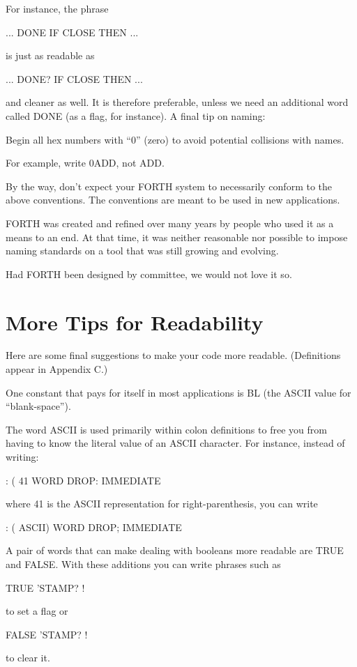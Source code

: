 For instance, the phrase
\begin{Code}
... DONE IF CLOSE THEN ...
\end{Code}
is just as readable as
\begin{Code}
... DONE? IF CLOSE THEN ...
\end{Code}
and cleaner as well.  It is therefore preferable, unless we need an additional
word called DONE (as a flag, for instance).
A final tip on naming:

\begin{tip}
Begin all hex numbers with ``0'' (zero) to avoid potential collisions with
names.
\end{tip}
For example, write 0ADD, not ADD.

By the way, don't expect your FORTH system to necessarily conform
to the above conventions.  The conventions are meant to be used in
new applications.

FORTH was created and refined over many years by people who
used it as a means to an end.  At that time, it was neither reasonable nor
possible to impose naming standards on a tool that was still growing and
evolving.

Had FORTH been designed by committee, we would not love it so.

\section{More Tips for Readability}

Here are some final suggestions to make your code more readable.
(Definitions appear in Appendix C.)

One constant that pays for itself in most applications is BL (the
ASCII value for ``blank-space'').

The word ASCII is used primarily within colon definitions to free
you from having to know the literal value of an ASCII character.  For instance,
instead of writing:
\begin{Code}
: ( 41 WORD DROP: IMMEDIATE
\end{Code}
where 41 is the ASCII representation for right-parenthesis, you can write
\begin{Code}
: ( ASCII) WORD DROP; IMMEDIATE
\end{Code}
A pair of words that can make dealing with booleans more readable are
TRUE and FALSE.  With these additions you can write phrases such as

\begin{Code}
TRUE 'STAMP? !
\end{Code}
to set a flag or
\begin{Code}
FALSE 'STAMP? !
\end{Code}
to clear it.

